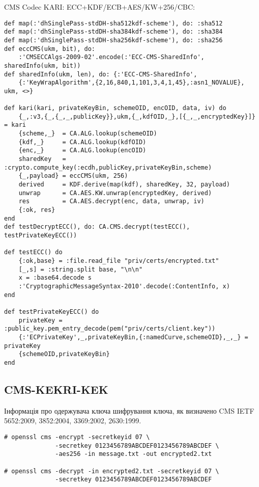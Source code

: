 CMS Codec KARI: ECC+KDF/ECB+AES/KW+256/CBC:

\begin{lstlisting}
def map(:'dhSinglePass-stdDH-sha512kdf-scheme'), do: :sha512
def map(:'dhSinglePass-stdDH-sha384kdf-scheme'), do: :sha384
def map(:'dhSinglePass-stdDH-sha256kdf-scheme'), do: :sha256
def eccCMS(ukm, bit), do:
    :'CMSECCAlgs-2009-02'.encode(:'ECC-CMS-SharedInfo', sharedInfo(ukm, bit))
def sharedInfo(ukm, len), do: {:'ECC-CMS-SharedInfo',
    {:'KeyWrapAlgorithm',{2,16,840,1,101,3,4,1,45},:asn1_NOVALUE}, ukm, <>}

def kari(kari, privateKeyBin, schemeOID, encOID, data, iv) do
    {_,:v3,{_,{_,_,publicKey}},ukm,{_,kdfOID,_},[{_,_,encryptedKey}]} = kari
    {scheme,_}  = CA.ALG.lookup(schemeOID)
    {kdf,_}     = CA.ALG.lookup(kdfOID)
    {enc,_}     = CA.ALG.lookup(encOID)
    sharedKey   = :crypto.compute_key(:ecdh,publicKey,privateKeyBin,scheme)
    {_,payload} = eccCMS(ukm, 256)
    derived     = KDF.derive(map(kdf), sharedKey, 32, payload)
    unwrap      = CA.AES.KW.unwrap(encryptedKey, derived)
    res         = CA.AES.decrypt(enc, data, unwrap, iv)
    {:ok, res}
end
def testDecryptECC(), do: CA.CMS.decrypt(testECC(), testPrivateKeyECC())

def testECC() do
    {:ok,base} = :file.read_file "priv/certs/encrypted.txt"
    [_,s] = :string.split base, "\n\n"
    x = :base64.decode s
    :'CryptographicMessageSyntax-2010'.decode(:ContentInfo, x)
end

def testPrivateKeyECC() do
    privateKey = :public_key.pem_entry_decode(pem("priv/certs/client.key"))
    {:'ECPrivateKey',_,privateKeyBin,{:namedCurve,schemeOID},_,_} = privateKey
    {schemeOID,privateKeyBin}
end
\end{lstlisting}


\newpage
\subsection{CMS-KEKRI-KEK}

Інформація про одержувача ключа шифрування ключа, як визначено CMS IETF 5652:2009, 3852:2004, 3369:2002, 2630:1999.

\begin{lstlisting}
# openssl cms -encrypt -secretkeyid 07 \
              -secretkey 0123456789ABCDEF0123456789ABCDEF \
              -aes256 -in message.txt -out encrypted2.txt

# openssl cms -decrypt -in encrypted2.txt -secretkeyid 07 \
              -secretkey 0123456789ABCDEF0123456789ABCDEF
\end{lstlisting}

